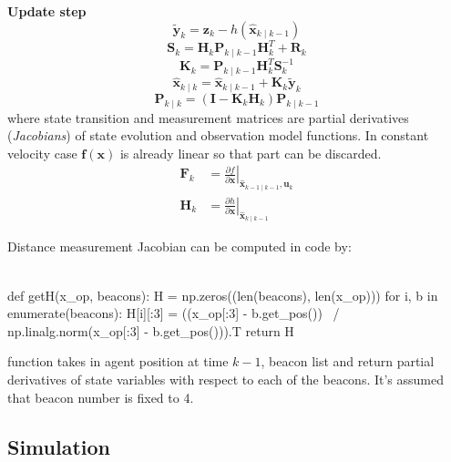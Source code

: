 \textbf{Update step} \smallskip
$$\tilde{\boldsymbol{y}}_k=\boldsymbol{z}_k-h\left(\hat{\boldsymbol{x}}_{k \mid k-1}\right)$$
$$\boldsymbol{S}_k=\boldsymbol{H}_k \boldsymbol{P}_{k \mid k-1} \boldsymbol{H}_k^T+\boldsymbol{R}_k$$
$$\boldsymbol{K}_k=\boldsymbol{P}_{k \mid k-1} \boldsymbol{H}_k^T \boldsymbol{S}_k^{-1}$$
$$\hat{\boldsymbol{x}}_{k \mid k}=\hat{\boldsymbol{x}}_{k \mid k-1}+\boldsymbol{K}_k \tilde{\boldsymbol{y}}_k$$
$$\boldsymbol{P}_{k \mid k}=\left(\boldsymbol{I}-\boldsymbol{K}_k \boldsymbol{H}_k\right) \boldsymbol{P}_{k \mid k-1}$$
where state transition and measurement matrices are partial derivatives (\emph{Jacobians}) of state evolution and observation model functions. In constant velocity case $\boldsymbol{f}(\boldsymbol{x})$ is already linear so that part can be discarded.
$$
    \begin{aligned}
        \boldsymbol{F}_k & =\left.\frac{\partial f}{\partial \boldsymbol{x}}\right|_{\hat{\boldsymbol{x}}_{k-1 \mid k-1}, \boldsymbol{u}_k} \\
        \boldsymbol{H}_k & =\left.\frac{\partial h}{\partial \boldsymbol{x}}\right|_{\hat{\boldsymbol{x}}_{k \mid k-1}}
    \end{aligned}
$$

Distance measurement Jacobian can be computed in code by:
\\
\\
\begin{minipage}{\linewidth}
    \begin{python}
    def getH(x_op, beacons):
        H = np.zeros((len(beacons), len(x_op)))
        for i, b in enumerate(beacons):
        H[i][:3] = ((x_op[:3] - b.get_pos()) \
            / np.linalg.norm(x_op[:3] - b.get_pos())).T
        return H
    \end{python}
\end{minipage}
function takes in agent position at time $k-1$, beacon list and return partial derivatives of state variables with respect to each of the beacons. It's assumed that beacon number is fixed to 4.

\subsection{Simulation}

